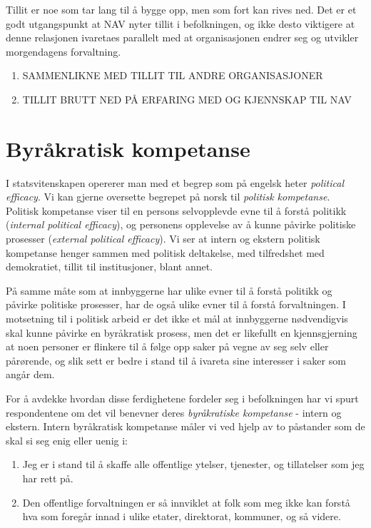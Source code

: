 \documentclass[
]{book}
\providecommand{\tightlist}{%
  \setlength{\itemsep}{0pt}\setlength{\parskip}{0pt}}
\begin{document}
Tillit er noe som tar lang til å bygge opp, men som fort kan rives ned.
Det er et godt utgangspunkt at NAV nyter tillit i befolkningen, og ikke desto viktigere at denne relasjonen ivaretaes parallelt med at organisasjonen endrer seg og utvikler morgendagens forvaltning.

\begin{enumerate}
\def\labelenumi{\arabic{enumi}.}
\tightlist
\item
  SAMMENLIKNE MED TILLIT TIL ANDRE ORGANISASJONER
\item
  TILLIT BRUTT NED PÅ ERFARING MED OG KJENNSKAP TIL NAV
\end{enumerate}

\hypertarget{byruxe5kratisk-kompetanse}{%
\section{Byråkratisk kompetanse}\label{byruxe5kratisk-kompetanse}}

I statsvitenskapen opererer man med et begrep som på engelsk heter \emph{political efficacy}.
Vi kan gjerne oversette begrepet på norsk til \emph{politisk kompetanse}.
Politisk kompetanse viser til en persons selvopplevde evne til å forstå politikk (\emph{internal political efficacy}), og personens opplevelse av å kunne påvirke politiske prosesser (\emph{external political efficacy}).
Vi ser at intern og ekstern politisk kompetanse henger sammen med politisk deltakelse, med tilfredshet med demokratiet, tillit til institusjoner, blant annet.

På samme måte som at innbyggerne har ulike evner til å forstå politikk og påvirke politiske prosesser, har de også ulike evner til å forstå forvaltningen.
I motsetning til i politisk arbeid er det ikke et mål at innbyggerne nødvendigvis skal kunne påvirke en byråkratisk prosess, men det er likefullt en kjennsgjerning at noen personer er flinkere til å følge opp saker på vegne av seg selv eller pårørende, og slik sett er bedre i stand til å ivareta sine interesser i saker som angår dem.

For å avdekke hvordan disse ferdighetene fordeler seg i befolkningen har vi spurt respondentene om det vil benevner deres \emph{byråkratiske kompetanse} - intern og ekstern.
Intern byråkratisk kompetanse måler vi ved hjelp av to påstander som de skal si seg enig eller uenig i:

\begin{enumerate}
\def\labelenumi{\arabic{enumi}.}
\item
  Jeg er i stand til å skaffe alle offentlige ytelser, tjenester, og tillatelser som jeg har rett på.
\item
  Den offentlige forvaltningen er så innviklet at folk som meg ikke kan forstå hva som foregår innad i ulike etater, direktorat, kommuner, og så videre.
\end{enumerate}
\end{document}
